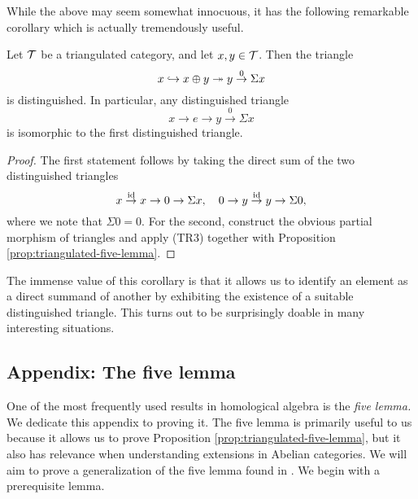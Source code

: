 While the above may seem somewhat innocuous, it has the following remarkable corollary which is actually tremendously useful.

\begin{corollary}\label{corollary:direct-sum-triangle}
	Let \(\mathcal{T}\) be a triangulated category, and let \(x,y\in \mathcal{T}\). Then the triangle
	\[ x\hookrightarrow x\oplus y \twoheadrightarrow y \overset{0}\to \Sigma x \]
	is distinguished. In particular, any distinguished triangle
	\[ x\to e\to y\overset{0}\to \Sigma x \]
	is isomorphic to the first distinguished triangle.
\end{corollary}
\begin{proof}
The first statement follows by taking the direct sum of the two distinguished triangles
\[ x\overset{\mathrm{id}}\to x\to 0 \to \Sigma x,\quad 0\to y\overset{\mathrm{id}}\to y \to \Sigma 0, \]
where we note that \(\Sigma 0 = 0\). For the second, construct the obvious partial morphism of triangles and apply (TR3) together with Proposition \ref{prop:triangulated-five-lemma}.
\end{proof}

The immense value of this corollary is that it allows us to identify an element as a direct summand of another by exhibiting the existence of a suitable distinguished triangle.
This turns out to be surprisingly doable in many interesting situations.

\subsection{Appendix: The five lemma}
One of the most frequently used results in homological algebra is the \emph{five lemma.} We dedicate this appendix to proving it.
The five lemma is primarily useful to us because it allows us to prove Proposition \ref{prop:triangulated-five-lemma}, but it also has relevance when understanding
extensions in Abelian categories. We will aim to prove a generalization of the five lemma found in \cite{kashiwara-schapira-book}. We begin with a prerequisite lemma.

